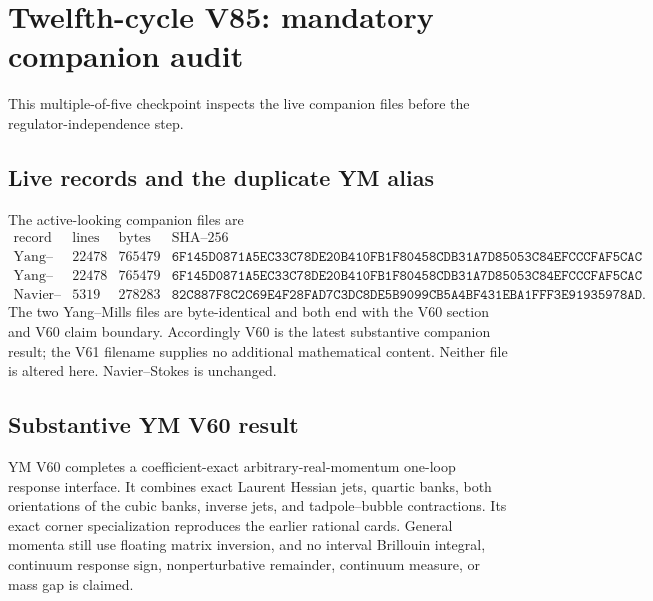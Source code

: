 \documentclass[11pt]{article}
\theoremstyle{remark}
\begin{document}


\section{Twelfth-cycle V85: mandatory companion audit}
\label{sec:v12v85}

This multiple-of-five checkpoint inspects the live companion files
before the regulator-independence step.

\subsection{Live records and the duplicate YM alias}

The active-looking companion files are
\[
\begin{array}{c|r|r|c}
\text{record}&\text{lines}&\text{bytes}&\text{SHA--256}\\ \hline
\text{Yang--Mills V60}&22478&765479&
\texttt{6F145D0871A5EC33C78DE20B410FB1F80458CDB31A7D85053C84EFCCCFAF5CAC}\\
\text{Yang--Mills V61}&22478&765479&
\texttt{6F145D0871A5EC33C78DE20B410FB1F80458CDB31A7D85053C84EFCCCFAF5CAC}\\
\text{Navier--Stokes V26}&5319&278283&
\texttt{82C887F8C2C69E4F28FAD7C3DC8DE5B9099CB5A4BF431EBA1FFF3E91935978AD}.
\end{array}                                                   \tag{85.1}
\]
The two Yang--Mills files are byte-identical and both end with the
V60 section and V60 claim boundary.  Accordingly V60 is the latest
substantive companion result; the V61 filename supplies no additional
mathematical content.  Neither file is altered here.  Navier--Stokes
is unchanged.

\subsection{Substantive YM V60 result}

YM V60 completes a coefficient-exact arbitrary-real-momentum
one-loop response interface.  It combines exact Laurent Hessian
jets, quartic banks, both orientations of the cubic banks, inverse
jets, and tadpole--bubble contractions.  Its exact corner
specialization reproduces the earlier rational cards.  General
momenta still use floating matrix inversion, and no interval
Brillouin integral, continuum response sign, nonperturbative
remainder, continuum measure, or mass gap is claimed.
\end{document}
